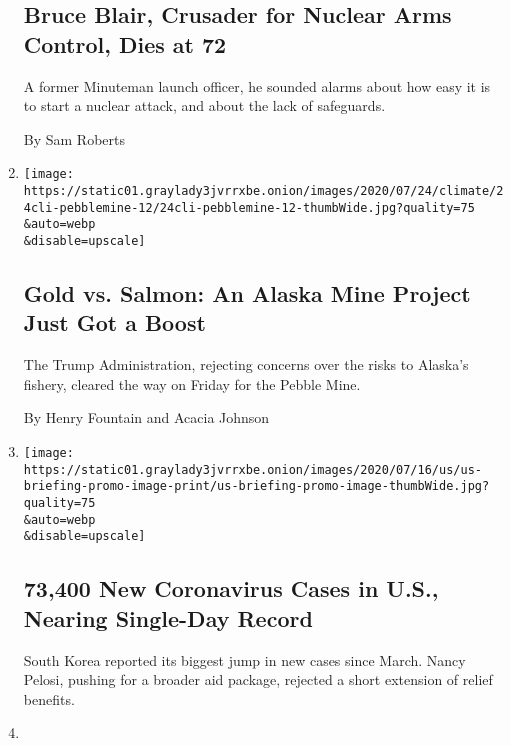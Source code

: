 \begin{enumerate}
{  \subsection{Bruce Blair, Crusader for Nuclear Arms Control, Dies at
  72}\label{bruce-blair-crusader-for-nuclear-arms-control-dies-at-72}}

  A former Minuteman launch officer, he sounded alarms about how easy it
  is to start a nuclear attack, and about the lack of safeguards.

  By Sam Roberts
\item
  \href{/2020/07/24/climate/pebble-mine-alaska-environment.html}{}

  \texttt{[image: https://static01.graylady3jvrrxbe.onion/images/2020/07/24/climate/24cli-pebblemine-12/24cli-pebblemine-12-thumbWide.jpg?quality=75\\\&auto=webp\\\&disable=upscale]}

  \hypertarget{gold-vs-salmon-an-alaska-mine-project-just-got-a-boost}{%
  \subsection{Gold vs. Salmon: An Alaska Mine Project Just Got a
  Boost}\label{gold-vs-salmon-an-alaska-mine-project-just-got-a-boost}}

  The Trump Administration, rejecting concerns over the risks to
  Alaska's fishery, cleared the way on Friday for the Pebble Mine.

  By Henry Fountain and Acacia Johnson
\item
  \href{/2020/07/24/world/coronavirus-covid-19.html}{}

  \texttt{[image: https://static01.graylady3jvrrxbe.onion/images/2020/07/16/us/us-briefing-promo-image-print/us-briefing-promo-image-thumbWide.jpg?quality=75\\\&auto=webp\\\&disable=upscale]}

  \hypertarget{73400-new-coronavirus-cases-in-us-nearing-single-day-record}{%
  \subsection{73,400 New Coronavirus Cases in U.S., Nearing Single-Day
  Record}\label{73400-new-coronavirus-cases-in-us-nearing-single-day-record}}

  South Korea reported its biggest jump in new cases since March. Nancy
  Pelosi, pushing for a broader aid package, rejected a short extension
  of relief benefits.
\item
  \href{/2020/07/24/climate/houston-flooding-race.html}{}


\end{enumerate}
